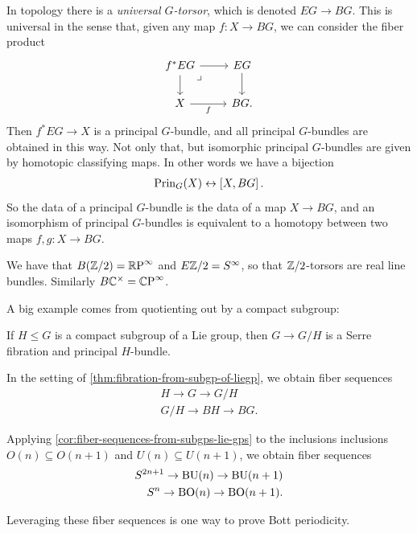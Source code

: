 \documentclass[11pt,openany]{book}
\begin{document}
In topology there is a \textit{universal $G$-torsor}, which is denoted $EG \to BG$. This is universal in the sense that, given any map $f \colon X \to BG$, we can consider the fiber product
\[ \begin{tikzcd}
    f^\ast EG\rar\dar\pb & EG\dar\\
    X\rar["f" below] & BG.
\end{tikzcd} \]
Then $f^\ast EG \to X$ is a principal $G$-bundle, and all principal $G$-bundles are obtained in this way. Not only that, but isomorphic principal $G$-bundles are given by homotopic classifying maps. In other words we have a bijection
\begin{equation}\label{eqn:representability-torsors-homotopy-theory}
\begin{aligned}
    \mathrm{Prin}_G(X) \leftrightarrow \left[ X,BG \right].
\end{aligned}
\end{equation}
%
So the data of a principal $G$-bundle is the data of a map $X \to BG$, and an isomorphism of principal $G$-bundles is equivalent to a homotopy between two maps $f,g \colon X \to BG$.

\begin{example} We have that $B(\mathbb{Z}/2) ={\mathbb{R}\text{P}}^\infty$ and $E\mathbb{Z}/2 = S^\infty$, so that $\mathbb{Z}/2$-torsors are real line bundles. Similarly $B\mathbb{C}^\times = {\mathbb{C}\text{P}}^\infty$.
\end{example}

A big example comes from quotienting out by a compact subgroup:

\begin{theorem}
\label{thm:fibration-from-subgp-of-liegp}
If $H \le G$ is a compact subgroup of a Lie group, then $G \to G/H$ is a Serre fibration and principal $H$-bundle.
\end{theorem}

\begin{corollary} 
\label{cor:fiber-sequences-from-subgps-lie-gps}
In the setting of \autoref{thm:fibration-from-subgp-of-liegp}, we obtain fiber sequences
\begin{align*}
    H \to G \to G/H \\
    G/H \to BH \to BG.
\end{align*}
\end{corollary}

\begin{example} Applying \autoref{cor:fiber-sequences-from-subgps-lie-gps} to the inclusions inclusions $O(n) \subseteq O(n+1)$ and $U(n) \subseteq U(n+1)$, we obtain fiber sequences
\begin{align*}
    S^{2n+1} \to \mathrm{BU}(n) \to \mathrm{BU}(n+1) \\
    S^n \to \mathrm{BO}(n) \to \mathrm{BO}(n+1).
\end{align*}
\end{example}
Leveraging these fiber sequences is one way to prove Bott periodicity.
\end{document}
